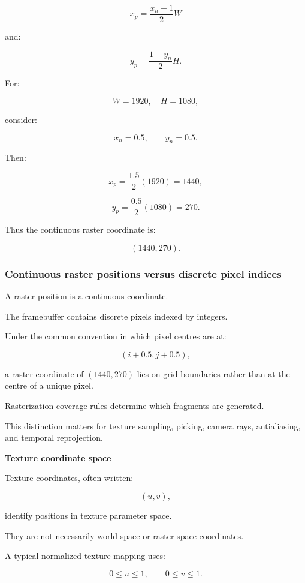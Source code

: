 \[
 \boxed{ x_p=\frac{x_n+1}{2}W }
\]

and:

\[
 \boxed{ y_p=\frac{1-y_n}{2}H }.
\]

For:

\[
 W=1920,\quad H=1080,
\]

consider:

\[
 x_n=0.5,\qquad y_n=0.5.
\]

Then:

\[
 x_p=\frac{1.5}{2}(1920)=1440,
\]

\[
 y_p=\frac{0.5}{2}(1080)=270.
\]

Thus the continuous raster coordinate is:

\[
 \boxed{(1440,270)}.
\]

\subsubsection{Continuous raster positions versus discrete pixel indices}\label{02-foundations-ii-ch032-continuous-raster-positions-versus-discrete-pixel-indices}

\hypertarget{02-foundations-ii-ch032-continuous-raster-positions-versus-discrete-pixel-indices}{}

A raster position is a continuous coordinate.

The framebuffer contains discrete pixels indexed by integers.

Under the common convention in which pixel centres are at:

\[
 (i+0.5,j+0.5),
\]

a raster coordinate of \((1440,270)\) lies on grid boundaries rather than at the centre of a unique pixel.

Rasterization coverage rules determine which fragments are generated.

This distinction matters for texture sampling, picking, camera rays, antialiasing, and temporal reprojection.

\textbf{Texture coordinate space}

Texture coordinates, often written:

\[
 (u,v),
\]

identify positions in texture parameter space.

They are not necessarily world-space or raster-space coordinates.

A typical normalized texture mapping uses:

\[
 0\le u\le1,\qquad0\le v\le1.
\]

